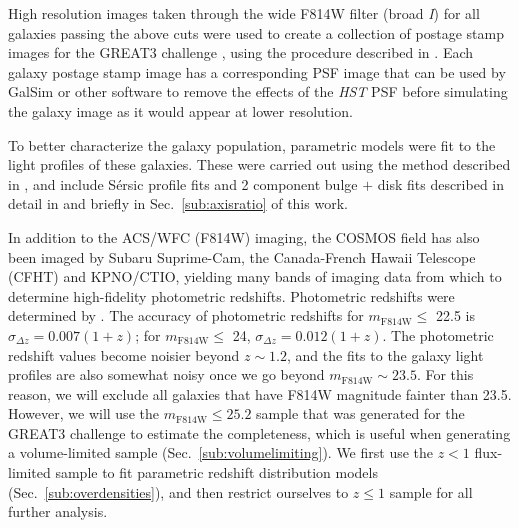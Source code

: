 \documentclass[twocolumn,useAMS,usenatbib]{mn2e}
\newcommand{\rachel}[1]{{\textcolor{red}{#1}}}
\newcommand{\sersic}{S\'{e}rsic }
\begin{document}
High resolution images taken through the wide F814W filter (broad
\emph{I}) for all galaxies passing the above cuts were used to create
a collection of postage stamp images for the GREAT3 challenge
\citep{great3}, using the procedure described in
\cite{2012MNRAS.420.1518M}.  Each galaxy postage stamp image has a
corresponding PSF image that can be used by {\sc GalSim} or other
software to remove the effects of the {\em HST} PSF before simulating
the galaxy image as it would appear at lower resolution.

To better characterize the galaxy population, parametric models were
fit to the light profiles of these galaxies.  These were carried out
using the method described in \cite{Claire_Fits}, and include
\sersic profile fits and 
2 component bulge $+$ disk fits described in detail in \cite{great3}
and briefly in Sec.~\ref{sub:axisratio} of this work.  

In addition to the ACS/WFC (F814W) imaging, the COSMOS field has also been imaged by Subaru Suprime-Cam, the
Canada-French Hawaii Telescope (CFHT) and KPNO/CTIO, yielding many bands
of imaging data from which to determine high-fidelity photometric
redshifts. 
Photometric redshifts were determined by
\cite{COSMOS_Photoz_30band}. The accuracy of photometric redshifts for
$m_\text{F814W}\le$ 22.5 is $\sigma_{\Delta z} = 0.007(1+z)$; for $m_\text{F814W}\le$ 24, $\sigma_{\Delta z} = 0.012(1+z)$.
The photometric redshift values become noisier beyond $z\sim 1.2$, and
the  fits to the galaxy light profiles are also somewhat noisy once we
go beyond $m_\text{F814W}\sim 23.5$.   
For this reason, we will exclude all galaxies that have F814W
magnitude fainter than 23.5. However, we will use the
$m_\text{F814W}\le 25.2$ sample that was generated for the GREAT3
challenge to estimate the completeness, which is useful when
generating a volume-limited sample (Sec.~\ref{sub:volumelimiting}).
We first use the $z<1$ flux-limited sample to fit parametric redshift
distribution models (Sec.~\ref{sub:overdensities}), and then
restrict ourselves to $z\le1$ sample for all further analysis. 
\end{document}
